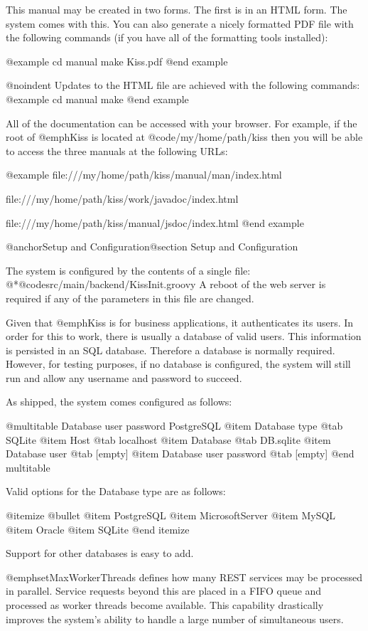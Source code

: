 This manual may be created in two forms.  The first is in an HTML
form.  The system comes with this.  You can also generate a nicely
formatted PDF file with the following commands (if you have all of the
formatting tools installed):

@example
cd manual
make Kiss.pdf
@end example

@noindent
Updates to the HTML file are achieved with the following commands:
@example
cd manual
make
@end example

All of the documentation can be accessed with your browser.  For
example, if the root of @emph{Kiss} is located at
@code{/my/home/path/kiss} then you will be able to access the three
manuals at the following URLs:

@example
file:///my/home/path/kiss/manual/man/index.html

file:///my/home/path/kiss/work/javadoc/index.html

file:///my/home/path/kiss/manual/jsdoc/index.html
@end example

@anchor{Setup and Configuration}@section Setup and Configuration

The system is configured by the contents of a single file:
@*@code{src/main/backend/KissInit.groovy} A reboot of the web server
is required if any of the parameters in this file are changed.

Given that @emph{Kiss} is for business applications, it authenticates its
users.  In order for this to work, there is usually a database of valid
users.  This information is persisted in an SQL database.  Therefore a
database is normally required.  However, for testing purposes, if no
database is configured, the system will still run and allow any
username and password to succeed.

As shipped, the system comes configured as follows:

@multitable {Database user password} {PostgreSQL} 
@item Database type
@tab SQLite
@item Host
@tab localhost
@item Database
@tab DB.sqlite
@item Database user
@tab [empty]
@item Database user password
@tab [empty]
@end multitable

Valid options for the Database type are as follows:

@itemize @bullet
@item
PostgreSQL
@item
MicrosoftServer
@item
MySQL
@item
Oracle
@item
SQLite
@end itemize

Support for other databases is easy to add.

@emph{setMaxWorkerThreads} defines how many REST services may be
processed in parallel.  Service requests beyond this are placed in a
FIFO queue and processed as worker threads become available.  This
capability drastically improves the system's ability to handle a large
number of simultaneous users.

